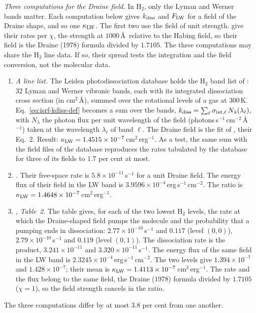 \emph{Three computations for the Draine field.} In H$_2$, only the
Lyman and Werner bands matter. Each computation below gives $k_{\rm diss}$ and
$F_{\rm LW}$ for a field of the Draine shape, and so one $\kappa_{\rm LW}$. The
first two use the field of unit strength. \citet{DraineBertoldi1996} give their
rates per $\chi$, the strength at $1000$\,\AA\ relative to the Habing field, so
their field is the Draine (1978) formula divided by $1.7105$. The three
computations may share the H$_2$ line data. If so, their spread tests the
integration and the field conversion, not the molecular data.
\begin{enumerate}
  \item \emph{A line list.} The Leiden photodissociation database
    \citep{Heays2017} holds the H$_2$ band list of \citet{Abgrall2000}: $32$
    Lyman and Werner vibronic bands, each with its integrated dissociation
    cross section (in cm$^2$\,\AA), summed over the rotational levels of a gas
    at $300$\,K. Eq.~\eqref{eq:isrf-kdiss-def} becomes a sum over the bands,
    $k_{\rm diss}=\sum_\ell \sigma_{{\rm int},\ell}\,N_\lambda(\lambda_\ell)$,
    with $N_\lambda$ the photon flux per unit wavelength of the field
    (photons\,s$^{-1}$\,cm$^{-2}$\,\AA$^{-1}$) taken at the wavelength
    $\lambda_\ell$ of band $\ell$. The Draine field is the fit of
    \citet{Sternberg2014}, their Eq.~2. Result:
    $\kappa_{\rm LW}=1.4515\times10^{-7}$\,cm$^2$\,erg$^{-1}$. As a test, the same sum with
    the field files of the database reproduces the rates tabulated by the
    database for three of its fields to $1.7$ per cent at most.
  \item \emph{\citet{Sternberg2014}.} Their free-space rate is
    $5.8\times10^{-11}$\,s$^{-1}$ for a unit Draine field. The energy flux of
    their field in the LW band is $3.9596\times10^{-4}$\,erg\,s$^{-1}$\,cm$^{-2}$.
    The ratio is $\kappa_{\rm LW}=1.4648\times10^{-7}$\,cm$^2$\,erg$^{-1}$.
  \item \emph{\citet{DraineBertoldi1996}, Table~2.} The table gives, for each of the
    two lowest H$_2$ levels, the rate at which the Draine-shaped field pumps
    the molecule and the probability that a pumping ends in dissociation:
    $2.77\times10^{-10}$\,s$^{-1}$ and $0.117$ (level $(0,0)$),
    $2.79\times10^{-10}$\,s$^{-1}$ and $0.119$ (level $(0,1)$). The
    dissociation rate is the product, $3.241\times10^{-11}$ and
    $3.320\times10^{-11}$\,s$^{-1}$. The energy flux of the same field in the
    LW band is $2.3245\times10^{-4}$\,erg\,s$^{-1}$\,cm$^{-2}$. The two
    levels give $1.394\times10^{-7}$ and $1.428\times10^{-7}$; their mean is
    $\kappa_{\rm LW}=1.4113\times10^{-7}$\,cm$^2$\,erg$^{-1}$. The rate and the flux belong
    to the same field, the Draine (1978) formula divided by $1.7105$
    ($\chi=1$), so the field strength cancels in the ratio.
\end{enumerate}
The three computations differ by at most $3.8$ per cent from one another.

